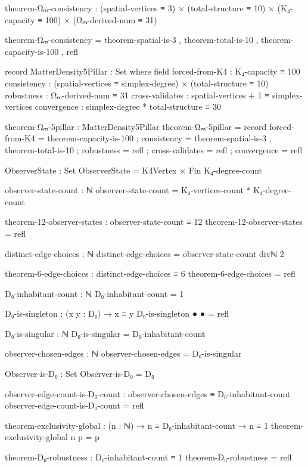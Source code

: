 \documentclass[11pt,a4paper]{book}
\begin{document}
\begin{code}
theorem-Ωₘ-consistency : (spatial-vertices ≡ 3)
                       × (total-structure ≡ 10)
                       × (K₄-capacity ≡ 100)
                       × (Ωₘ-derived-num ≡ 31)

theorem-Ωₘ-consistency = theorem-spatial-is-3 
                       , theorem-total-is-10
                       , theorem-capacity-is-100
                       , refl


record MatterDensity5Pillar : Set where
  field
    forced-from-K4  : K₄-capacity ≡ 100
    consistency     : (spatial-vertices ≡ simplex-degree) × (total-structure ≡ 10)
    robustness      : Ωₘ-derived-num ≡ 31
    cross-validates : spatial-vertices + 1 ≡ simplex-vertices
    convergence     : simplex-degree * total-structure ≡ 30

theorem-Ωₘ-5pillar : MatterDensity5Pillar
theorem-Ωₘ-5pillar = record
  { forced-from-K4  = theorem-capacity-is-100
  ; consistency     = theorem-spatial-is-3 , theorem-total-is-10
  ; robustness      = refl
  ; cross-validates = refl
  ; convergence     = refl
  }

ObserverState : Set
ObserverState = K4Vertex × Fin K₄-degree-count

observer-state-count : ℕ
observer-state-count = K₄-vertices-count * K₄-degree-count

theorem-12-observer-states : observer-state-count ≡ 12
theorem-12-observer-states = refl

distinct-edge-choices : ℕ
distinct-edge-choices = observer-state-count divℕ 2

theorem-6-edge-choices : distinct-edge-choices ≡ 6
theorem-6-edge-choices = refl

D₀-inhabitant-count : ℕ
D₀-inhabitant-count = 1

D₀-is-singleton : (x y : D₀) → x ≡ y
D₀-is-singleton ● ● = refl

D₀-is-singular : ℕ
D₀-is-singular = D₀-inhabitant-count

observer-chosen-edges : ℕ
observer-chosen-edges = D₀-is-singular


Observer-is-D₀ : Set
Observer-is-D₀ = D₀

observer-edge-count-is-D₀-count : observer-chosen-edges ≡ D₀-inhabitant-count
observer-edge-count-is-D₀-count = refl

theorem-exclusivity-global : (n : ℕ) → n ≡ D₀-inhabitant-count → n ≡ 1
theorem-exclusivity-global n p = p

theorem-D₀-robustness : D₀-inhabitant-count ≡ 1
theorem-D₀-robustness = refl



\end{code}
\end{document}
